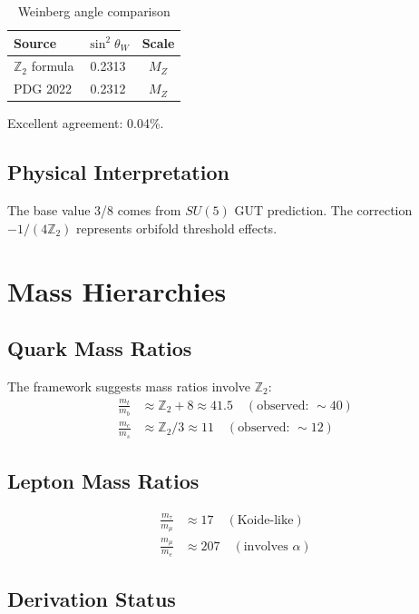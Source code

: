 \documentclass[12pt,a4paper]{article}
\begin{document}
\begin{table}[h]
\centering
\begin{tabular}{lcc}
\toprule
Source & $\sin^2\theta_W$ & Scale \\
\midrule
$\mathbb{Z}_2$ formula & 0.2313 & $M_Z$ \\
PDG 2022 & 0.2312 & $M_Z$ \\
\bottomrule
\end{tabular}
\caption{Weinberg angle comparison}
\end{table}

Excellent agreement: 0.04\%.

\subsection{Physical Interpretation}

The base value 3/8 comes from $SU(5)$ GUT prediction. The correction $-1/(4\mathbb{Z}_2)$ represents orbifold threshold effects.

\section{Mass Hierarchies}

\subsection{Quark Mass Ratios}

The framework suggests mass ratios involve $\mathbb{Z}_2$:
\begin{align}
\frac{m_t}{m_b} &\approx \mathbb{Z}_2 + 8 \approx 41.5 \quad (\text{observed: } \sim 40) \\
\frac{m_c}{m_s} &\approx \mathbb{Z}_2/3 \approx 11 \quad (\text{observed: } \sim 12)
\end{align}

\subsection{Lepton Mass Ratios}

\begin{align}
\frac{m_\tau}{m_\mu} &\approx 17 \quad (\text{Koide-like}) \\
\frac{m_\mu}{m_e} &\approx 207 \quad (\text{involves } \alpha)
\end{align}

\subsection{Derivation Status}
\end{document}
